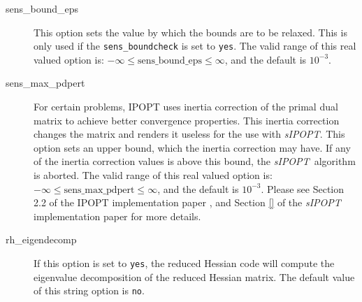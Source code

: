 \documentclass[letter, 11pt]{article}
\newcommand{\sensKKT}{\emph{sIPOPT}}
\newcommand{\boundcheckopt}{sens\_boundcheck}
\newcommand{\boundepsopt}{sens\_bound\_eps}
\newcommand{\maxpdpertopt}{sens\_max\_pdpert}
\newcommand{\eigendecompopt}{rh\_eigendecomp}
\begin{document}
\begin{description}
\item[\boundepsopt] This option sets the value by which the bounds are to be relaxed. This is only used if the
\texttt{\boundcheckopt} is set to \texttt{yes}. The valid range of this real valued option is: $-\infty \leq \mbox{\boundepsopt} \leq \infty$, and the default is $10^{-3}$.

\item[\maxpdpertopt] For certain problems, IPOPT uses inertia correction of the primal dual matrix to achieve better convergence properties. This inertia correction changes the matrix and renders it useless for the use with \sensKKT. This option sets an upper bound, which the inertia correction may have. If any of the inertia correction values is above this bound, the \sensKKT\  algorithm is aborted. The valid range of this real valued option is: $-\infty \leq \mbox{\maxpdpertopt} \leq \infty$, and the default is $10^{-3}$. Please see Section 2.2 of the IPOPT implementation paper \cite{Waechter2006}, and Section \ref{} of the {\sensKKT} implementation paper \cite{pirnay:2011} for more details.

\item[\eigendecompopt] If this option is set to \texttt{yes}, the reduced Hessian code will compute the eigenvalue decomposition of the reduced Hessian matrix. The default value of this string option is \texttt{no}.
\end{description}


\end{document}
